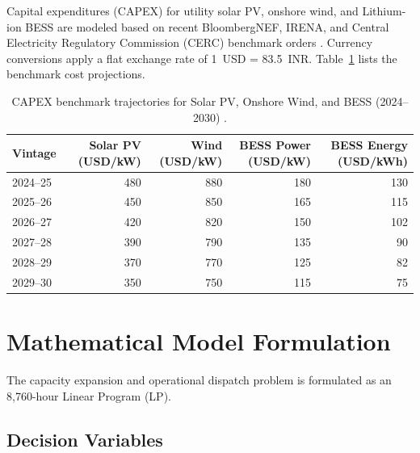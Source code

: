 \documentclass[11pt,a4paper]{article}
\begin{document}
Capital expenditures (CAPEX) for utility solar PV, onshore wind, and Lithium-ion BESS are modeled based on recent BloombergNEF, IRENA, and Central Electricity Regulatory Commission (CERC) benchmark orders \cite{IRENA2021, BNEF2023, CERC2024}. Currency conversions apply a flat exchange rate of 1~USD = 83.5~INR. Table~\ref{tab:capex_projections} lists the benchmark cost projections.

\begin{table}[htbp]
\centering
\small
\caption{CAPEX benchmark trajectories for Solar PV, Onshore Wind, and BESS (2024--2030) \cite{BNEF2023, CERC2024}.}
\label{tab:capex_projections}
\begin{tabular}{lrrrr}
\toprule
Vintage & Solar PV (USD/kW) & Wind (USD/kW) & BESS Power (USD/kW) & BESS Energy (USD/kWh) \\
\midrule
2024--25 & 480 & 880 & 180 & 130 \\
2025--26 & 450 & 850 & 165 & 115 \\
2026--27 & 420 & 820 & 150 & 102 \\
2027--28 & 390 & 790 & 135 & 90 \\
2028--29 & 370 & 770 & 125 & 82 \\
2029--30 & 350 & 750 & 115 & 75 \\
\bottomrule
\end{tabular}
\end{table}

\section{Mathematical Model Formulation}
\label{sec:model}

The capacity expansion and operational dispatch problem is formulated as an 8,760-hour Linear Program (LP).

\subsection{Decision Variables}
\label{sec:dec_vars}
\end{document}
